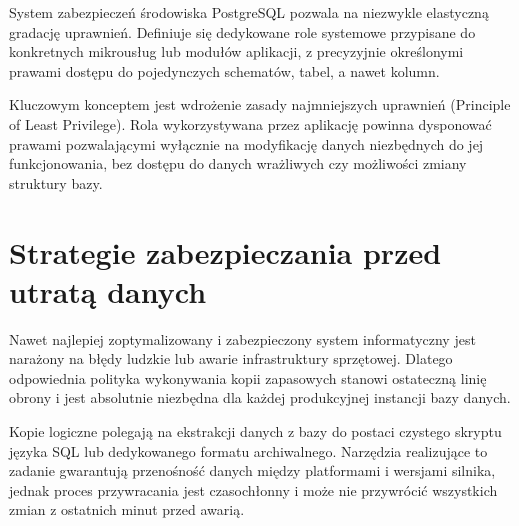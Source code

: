 \documentclass[letterpaper,10pt,english]{sphinxmanual}
\begin{document}
\sphinxAtStartPar
System zabezpieczeń środowiska PostgreSQL pozwala na niezwykle elastyczną gradację uprawnień. Definiuje się dedykowane role systemowe przypisane do konkretnych mikrousług lub modułów aplikacji, z precyzyjnie określonymi prawami dostępu do pojedynczych schematów, tabel, a nawet kolumn.

\sphinxAtStartPar
Kluczowym konceptem jest wdrożenie zasady najmniejszych uprawnień (Principle of Least Privilege). Rola wykorzystywana przez aplikację powinna dysponować prawami pozwalającymi wyłącznie na modyfikację danych niezbędnych do jej funkcjonowania, bez dostępu do danych wrażliwych czy możliwości zmiany struktury bazy.

\begin{sphinxVerbatim}[commandchars=\\\{\}]
\end{sphinxVerbatim}


\section{Strategie zabezpieczania przed utratą danych}
\label{\detokenize{rozdzial_1/index:strategie-zabezpieczania-przed-utrata-danych}}
\sphinxAtStartPar
Nawet najlepiej zoptymalizowany i zabezpieczony system informatyczny jest narażony na błędy ludzkie lub awarie infrastruktury sprzętowej. Dlatego odpowiednia polityka wykonywania kopii zapasowych stanowi ostateczną linię obrony i jest absolutnie niezbędna dla każdej produkcyjnej instancji bazy danych.

\sphinxAtStartPar
Kopie logiczne polegają na ekstrakcji danych z bazy do postaci czystego skryptu języka SQL lub dedykowanego formatu archiwalnego. Narzędzia realizujące to zadanie gwarantują przenośność danych między platformami i wersjami silnika, jednak proces przywracania jest czasochłonny i może nie przywrócić wszystkich zmian z ostatnich minut przed awarią.
\end{document}
